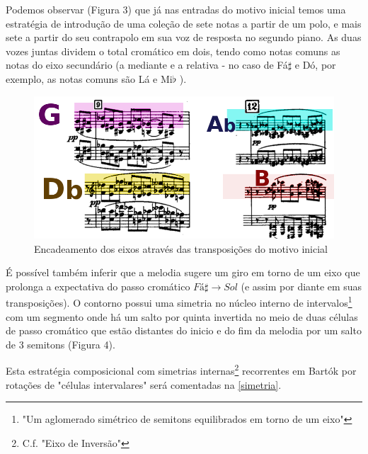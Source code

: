 \documentclass[
	12pt,				%
	openright,			%
	twoside,			%
	a4paper,			%
	english,			%
	french,				%
	spanish,			%
	brazil				%
	]{abntex2}
\begin{document}
Podemos observar (Figura 3) que já nas entradas do motivo inicial temos uma estratégia de introdução de uma coleção de sete notas a partir de um polo, e mais sete a partir do seu contrapolo em sua voz de resposta no segundo piano. As duas vozes juntas dividem o total cromático em dois, tendo como notas comuns as notas do eixo secundário (a mediante e a relativa - no caso de Fá$\sharp$ e Dó, por exemplo, as notas comuns são Lá e Mi$\flat$ ).

\begin{figure}[!h]
	\caption{\label{fig_grafico}Encadeamento dos eixos através das transposições do motivo inicial }
	\begin{center}
	    \includegraphics[scale=0.35]{axis/sonata2pianos_mm9-12.png}
	\end{center}
\end{figure}

É possível também inferir que a melodia sugere um giro em torno de um eixo que prolonga a expectativa do passo cromático $Fá\sharp \rightarrow Sol$ (e assim por diante em suas transposições). O contorno possui uma simetria no núcleo interno de intervalos\footnote{"Um aglomerado simétrico de semitons equilibrados em torno de um eixo"\cite[p. 120]{straus2004}} com um segmento onde há um salto por quinta invertida no meio de duas células de passo cromático que estão distantes do inicio e do fim da melodia por um salto de 3 semitons (Figura 4). 

Esta estratégia composicional com simetrias internas\footnote{C.f. "Eixo de Inversão"\cite[p. 121]{straus2004}} recorrentes em Bartók por rotações de "células intervalares"\cite[p. 128]{susanni_antokoletz2012music} será comentadas na \autoref{simetria}.
\end{document}
